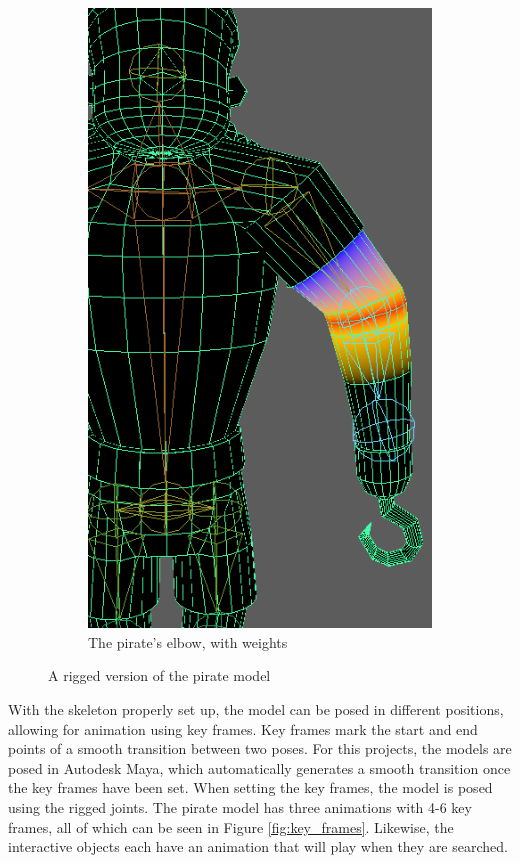 \begin{figure}[h!]
\begin{subfigure}[b]{0.45\textwidth}
		\includegraphics[scale=0.6]{figures/elbow_pirate.png}
		\caption{The pirate's elbow, with weights}
		\label{fig:elbow_pirate}
	\end{subfigure}
	\caption{A rigged version of the pirate model}
	\label{fig:riggin}
\end{figure}

With the skeleton properly set up, the model can be posed in different positions, allowing for animation using key frames. Key frames mark the start and end points of a smooth transition between two poses. For this projects, the models are posed in Autodesk Maya, which automatically generates a smooth transition once the key frames have been set. When setting the key frames, the model is posed using the rigged joints. The pirate model has three animations with 4-6 key frames, all of which can be seen in Figure \ref{fig:key_frames}. Likewise, the interactive objects each have an animation that will play when they are searched.

